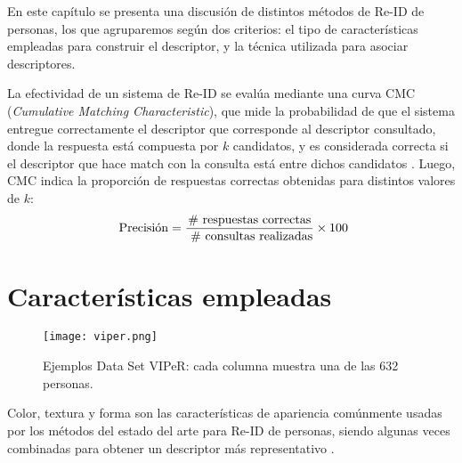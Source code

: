 \documentclass[../memoria.tex]{subfiles}
\begin{document}
\label{trabajo relacionado}

\indent En este capítulo se presenta una discusión de distintos métodos de Re-ID de personas, los que agruparemos según dos criterios: el tipo de características empleadas para construir el descriptor, y la técnica utilizada para asociar descriptores. 


\indent La efectividad de un sistema de Re-ID se evalúa mediante una curva CMC (\emph{Cumulative Matching Characteristic}), que mide la probabilidad de que el sistema entregue correctamente el descriptor que corresponde al descriptor consultado, donde la respuesta está compuesta por $k$ candidatos, y es considerada correcta si el descriptor que hace match con la consulta está entre dichos candidatos \cite{decann2012can}. Luego, CMC indica la proporción de respuestas correctas obtenidas para distintos valores de $k$:$${\rm\ Precisi\acute{o}n} = \frac{{\rm \#\ respuestas\ correctas}}{{\rm\ \#\ consultas\ realizadas}}\times 100$$

\section{Características empleadas}
\begin{figure}
  \centering
  \texttt{[image: viper.png]}
  \caption{Ejemplos Data Set VIPeR: cada columna muestra una de las 632 personas.}
  \label{fig:viper}
\end{figure}
\indent Color, textura y forma son las características de apariencia comúnmente usadas por los métodos del estado del arte para Re-ID de personas, siendo algunas veces combinadas para obtener un descriptor más representativo \cite{mazzon2012person}. 
\end{document}
